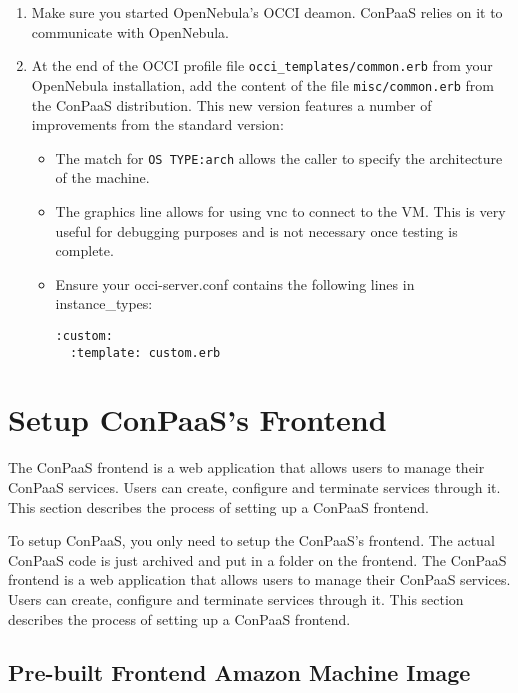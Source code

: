 \documentclass[10pt]{article}
\begin{document}
\begin{enumerate}
\item Make sure you started OpenNebula's OCCI deamon. ConPaaS relies
  on it to communicate with OpenNebula.

\item At the end of the OCCI profile file \verb+occi_templates/common.erb+ 
  from your OpenNebula installation, add the content of the file
  \verb+misc/common.erb+ from the ConPaaS distribution. This new version 
  features a number of improvements from the standard version:
  \begin{itemize}
  \item The match for \verb+OS TYPE:arch+ allows the caller to specify
    the architecture of the machine.
  \item The graphics line allows for using vnc to connect to the VM.
    This is very useful for debugging purposes and is not necessary
    once testing is complete.
\item Ensure your occi-server.conf contains the following lines in instance\_types:
\begin{verbatim}
:custom:
  :template: custom.erb
\end{verbatim}

  \end{itemize}
\end{enumerate}

\section{Setup ConPaaS's Frontend}
\label{sec:frontend}

The ConPaaS frontend is a web application that allows users to manage
their ConPaaS services. Users can create, configure and terminate
services through it. This section describes the process of setting up
a ConPaaS frontend.

To setup ConPaaS, you only need to setup the ConPaaS's frontend. The
actual ConPaaS code is just archived and put in a folder on the frontend.
The ConPaaS frontend is a web application that allows users to manage
their ConPaaS services. Users can create, configure and terminate
services through it. This section describes the process of setting up
a ConPaaS frontend.

\subsection{Pre-built Frontend Amazon Machine Image}
\label{sec:frontend-ami}
\end{document}
